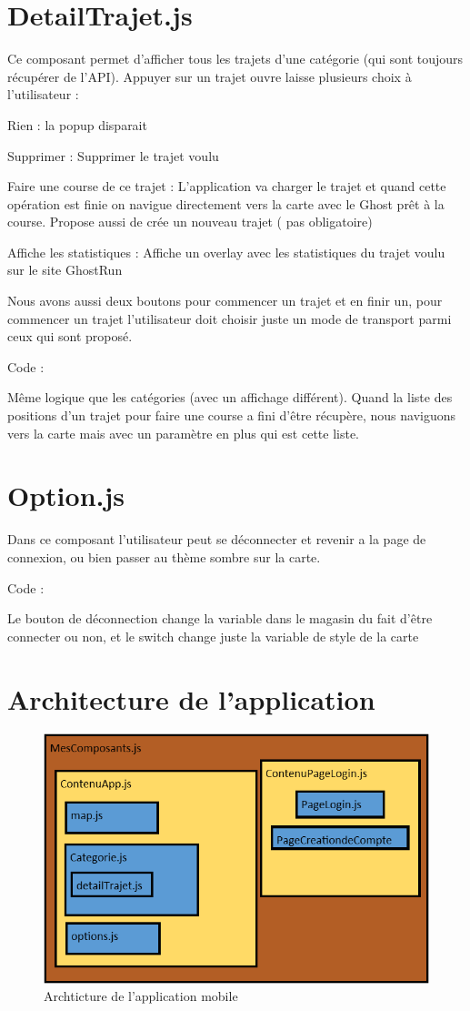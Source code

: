 \section{DetailTrajet.js}
Ce composant permet d’afficher tous les trajets d’une catégorie (qui sont toujours récupérer de l’API). Appuyer sur un trajet ouvre laisse plusieurs choix à l’utilisateur :

Rien : la popup disparait

Supprimer : Supprimer le trajet voulu

Faire une course de ce trajet : L’application va charger le trajet et quand cette opération est finie on navigue directement vers la carte avec le Ghost prêt à la course. Propose aussi de crée un nouveau trajet ( pas obligatoire)

Affiche les statistiques : Affiche un overlay avec les statistiques du trajet voulu sur le site GhostRun

Nous avons aussi deux boutons pour commencer un trajet et en finir un, pour commencer un trajet l’utilisateur doit choisir juste un mode de transport parmi ceux qui sont proposé.

Code :

Même logique que les catégories (avec un affichage différent).
Quand la liste des positions d’un trajet pour faire une course a fini d’être récupère, nous naviguons vers la carte mais avec un paramètre en plus qui est cette liste.

\section{Option.js}

Dans ce composant l’utilisateur peut se déconnecter et revenir a la page de connexion, ou bien passer au thème sombre sur la carte.

Code :

Le bouton de déconnection change la variable dans le magasin du fait d’être connecter ou non, et le switch change juste la variable de style de la carte

\section{Architecture de l'application}

\begin{figure}[h]
    \centering
    \includegraphics[keepaspectratio, width=2\textwidth/2, height=2\textheight/5]{ima/archticture.png}
    \caption{Archticture de l'application mobile }
    \label{fig:25-archticture}
\end{figure}




